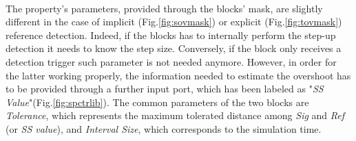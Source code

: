 \paragraph{} The property's parameters, provided through the blocks' mask, are slightly different in the case of implicit (Fig.\ref{fig:sovmask}) or explicit (Fig.\ref{fig:tovmask}) reference detection. Indeed, if the blocks has to internally perform the step-up detection it needs to know the step size. Conversely, if the block only receives a detection trigger such parameter is not needed anymore. However, in order for the latter working properly, the information needed to estimate the overshoot has to be provided through a further input port, which has been labeled as "\textit{SS Value}"(Fig.\ref{fig:spctrlib}). The common parameters of the two blocks are \textit{Tolerance}, which represents the maximum tolerated distance among \textit{Sig} and \textit{Ref} (or \textit{SS value}), and \textit{Interval Size}, which corresponds to the simulation time.
